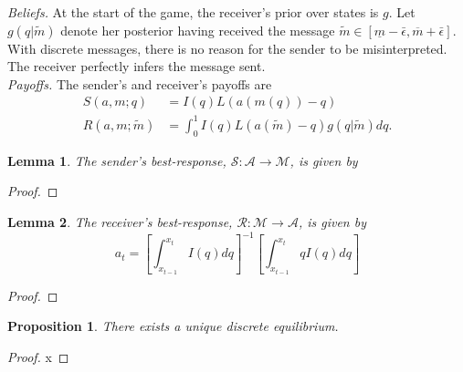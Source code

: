 \documentclass[12pt]{article}
\newtheorem{lemma}{Lemma}
\newtheorem{proposition}{Proposition}
\begin{document}
\noindent\textit{Beliefs.} At the start of the game, the receiver's prior over states is $g$. Let $g(q|\tilde{m})$ denote her posterior having received the message $\tilde{m}\in[\underline{m}-\bar{\epsilon},\overline{m}+\bar{\epsilon}]$. With discrete messages, there is no reason for the sender to be misinterpreted. The receiver perfectly infers the message sent.\\

\noindent\textit{Payoffs.} The sender's and receiver's payoffs are
\begin{align}
S(a,m;q)&=I(q)L(a(m(q))-q)\\
R(a,m;\tilde{m})&=\int_{0}^{1}{I(q)L(a(\tilde{m})-q)g(q|\tilde{m})dq}.
\end{align}

\begin{lemma}
The sender's best-response, $\mathcal{S}:\mathcal{A}\rightarrow\mathcal{M}$, is given by
\end{lemma}
\begin{proof}

\end{proof}

\begin{lemma}
The receiver's best-response, $\mathcal{R}:\mathcal{M}\rightarrow\mathcal{A}$, is given by
\begin{equation}
a_{t}=\left[\int_{x_{t-1}}^{x_{t}}{I(q)dq}\right]^{-1}\left[\int_{x_{t-1}}^{x_{t}}{qI(q)dq}\right]
\end{equation}
\end{lemma}
\begin{proof}

\end{proof}

\begin{proposition}
There exists a unique discrete equilibrium.
\end{proposition}
\begin{proof}
x
\end{proof}
\end{document}
